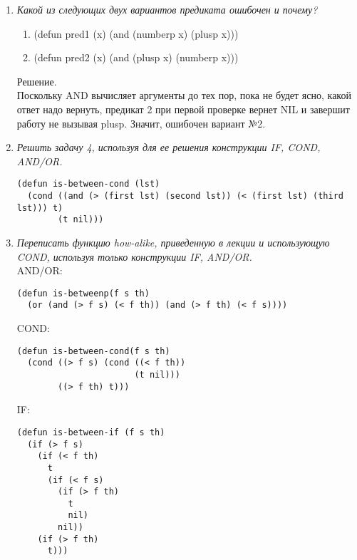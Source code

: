 \begin{enumerate}[wide=0pt]
\begin{lstlisting}
(defun not-less (x y) 
  (>= x y))
\end{lstlisting}
\item\textit{Какой из следующих двух вариантов предиката ошибочен и почему?}
\begin{multicols}{2}
\begin{enumerate}[label=\arabic*), leftmargin=17pt]
\item\begin{itemlisting}[language=lisp]
(defun pred1 (x)
  (and (numberp x) (plusp x)))
\end{itemlisting}
\item\begin{itemlisting}[language=lisp]
(defun pred2 (x)
  (and (plusp x) (numberp x)))
\end{itemlisting}
\end{enumerate}
\end{multicols}
Решение. \\ Поскольку AND вычисляет аргументы до тех пор, пока не будет ясно, какой ответ надо вернуть, предикат 2 при первой проверке вернет NIL и завершит работу не вызывая plusp. Значит, ошибочен вариант №2.
\item \textit{Решить задачу 4, используя для ее решения конструкции IF, COND, AND/OR.}
\begin{lstlisting}
(defun is-between-cond (lst)
  (cond ((and (> (first lst) (second lst)) (< (first lst) (third lst))) t)
        (t nil)))
\end{lstlisting}
\item \textit{Переписать функцию how-alike, приведенную в лекции и использующую COND, используя только конструкции IF, AND/OR.}\\
AND/OR:
\begin{lstlisting}
(defun is-betweenp(f s th)
  (or (and (> f s) (< f th)) (and (> f th) (< f s))))
\end{lstlisting}
COND:
\begin{lstlisting}
(defun is-between-cond(f s th)
  (cond ((> f s) (cond ((< f th))
                       (t nil)))
        ((> f th) t)))
\end{lstlisting}
IF:
\begin{lstlisting}
(defun is-between-if (f s th)
  (if (> f s)
    (if (< f th)
      t
      (if (< f s)
        (if (> f th)
          t
          nil)
        nil))
    (if (> f th)
      t)))
\end{lstlisting}

\end{enumerate}

